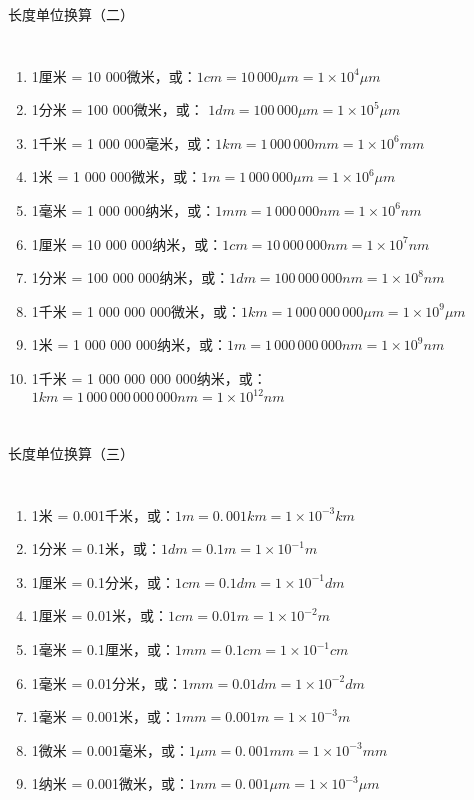 \documentclass[aspectratio=169]{ctexbeamer} %
\begin{document}
\begin{frame}[t]{长度单位换算（二）}
\begin{columns}
\begin{enumerate}[label={\Alph*.}]
\item 1厘米 = 10 000微米，或：$1 cm = 10 \, 000 \mu m = 1 \times 10^4 \mu m$ 
\item 1分米 = 100 000微米，或： $1 dm = 100 \, 000 \mu m = 1 \times 10^5 \mu m$ 
\item 1千米 = 1 000 000毫米，或：$1 km = 1 \, 000 \, 000 mm = 1 \times 10^6 mm$ 
\item 1米 = 1 000 000微米，或：$1 m = 1 \, 000 \, 000 \mu m = 1 \times 10^6 \mu m$ 
\item 1毫米 = 1 000 000纳米，或：$1 mm = 1 \, 000 \, 000 nm = 1 \times 10^6 nm$ 
\item 1厘米 = 10 000 000纳米，或：$1 cm = 10 \, 000 \, 000 nm = 1 \times 10^7 nm$ 
\item 1分米 = 100 000 000纳米，或：$1 dm = 100 \, 000 \, 000 nm = 1 \times 10^8 nm$ 
\item 1千米 = 1 000 000 000微米，或：$1 km = 1 \, 000 \, 000 \, 000 \mu m = 1 \times 10^9 \mu m$ 
\item 1米 = 1 000 000 000纳米，或：$1 m = 1 \, 000 \, 000 \, 000 nm = 1 \times 10^9 nm$ 
\item 1千米 = 1 000 000 000 000纳米，或：$1 km = 1 \, 000 \, 000 \, 000 \, 000 nm = 1 \times 10^{12} nm$ 
\end{enumerate}
\end{columns}
\end{frame}

\begin{frame}[t]{长度单位换算（三）}
\begin{columns}
\begin{enumerate}[label={\Alph*.}]
\item 1米 = 0.001千米，或：$1 m = 0. \, 001 km = 1 \times 10^{-3} km$ 
\item 1分米 = 0.1米，或：$1 dm = 0.1 m = 1 \times 10^{-1} m$ 
\item 1厘米 = 0.1分米，或：$1 cm = 0.1 dm = 1 \times 10^{-1} dm$ 
\item 1厘米 = 0.01米，或：$1 cm = 0.01 m = 1 \times 10^{-2} m$ 
\item 1毫米 = 0.1厘米，或：$1 mm = 0.1 cm = 1 \times 10^{-1} cm$ 
\item 1毫米 = 0.01分米，或：$1 mm = 0.01 dm = 1 \times 10^{-2} dm$ 
\item 1毫米 = 0.001米，或：$1 mm = 0.001 m = 1 \times 10^{-3} m$ 
\item 1微米 = 0.001毫米，或：$1 \mu m = 0. \, 001 mm = 1 \times 10^{-3} mm$ 
\item 1纳米 = 0.001微米，或：$1 nm = 0. \, 001 \mu m = 1 \times 10^{-3} \mu m$ 
\end{enumerate}
\end{columns}
\end{frame}
\end{document}
